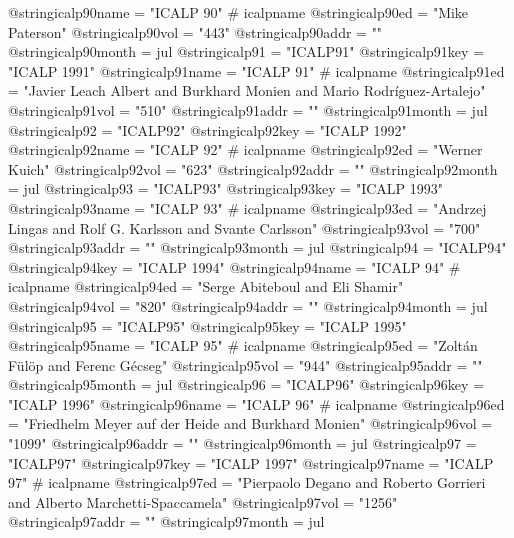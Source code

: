 @string{icalp90name =           "ICALP 90" # icalpname}
@string{icalp90ed =             "Mike Paterson"}
@string{icalp90vol =            "443"}
@string{icalp90addr =           ""}
@string{icalp90month =          jul}
@string{icalp91 =               "ICALP91"}
@string{icalp91key =            "ICALP 1991"}
@string{icalp91name =           "ICALP 91" # icalpname}
@string{icalp91ed =             "Javier Leach Albert and Burkhard Monien and Mario Rodr{\'i}guez-Artalejo"}
@string{icalp91vol =            "510"}
@string{icalp91addr =           ""}
@string{icalp91month =          jul}
@string{icalp92 =               "ICALP92"}
@string{icalp92key =            "ICALP 1992"}
@string{icalp92name =           "ICALP 92" # icalpname}
@string{icalp92ed =             "Werner Kuich"}
@string{icalp92vol =            "623"}
@string{icalp92addr =           ""}
@string{icalp92month =          jul}
@string{icalp93 =               "ICALP93"}
@string{icalp93key =            "ICALP 1993"}
@string{icalp93name =           "ICALP 93" # icalpname}
@string{icalp93ed =             "Andrzej Lingas and Rolf G. Karlsson and Svante Carlsson"}
@string{icalp93vol =            "700"}
@string{icalp93addr =           ""}
@string{icalp93month =          jul}
@string{icalp94 =               "ICALP94"}
@string{icalp94key =            "ICALP 1994"}
@string{icalp94name =           "ICALP 94" # icalpname}
@string{icalp94ed =             "Serge Abiteboul and Eli Shamir"}
@string{icalp94vol =            "820"}
@string{icalp94addr =           ""}
@string{icalp94month =          jul}
@string{icalp95 =               "ICALP95"}
@string{icalp95key =            "ICALP 1995"}
@string{icalp95name =           "ICALP 95" # icalpname}
@string{icalp95ed =             "Zolt{\'a}n F{\"u}l{\"o}p and Ferenc G{\'e}cseg"}
@string{icalp95vol =            "944"}
@string{icalp95addr =           ""}
@string{icalp95month =          jul}
@string{icalp96 =               "ICALP96"}
@string{icalp96key =            "ICALP 1996"}
@string{icalp96name =           "ICALP 96" # icalpname}
@string{icalp96ed =             "Friedhelm Meyer {auf der Heide} and Burkhard Monien"}
@string{icalp96vol =            "1099"}
@string{icalp96addr =           ""}
@string{icalp96month =          jul}
@string{icalp97 =               "ICALP97"}
@string{icalp97key =            "ICALP 1997"}
@string{icalp97name =           "ICALP 97" # icalpname}
@string{icalp97ed =             "Pierpaolo Degano and Roberto Gorrieri and Alberto Marchetti-Spaccamela"}
@string{icalp97vol =            "1256"}
@string{icalp97addr =           ""}
@string{icalp97month =          jul}

